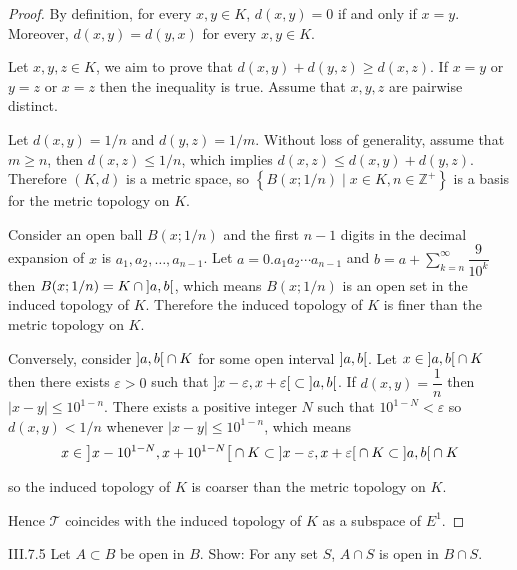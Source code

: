 \begin{proof}
	By definition, for every \( x, y \in K \), \( d(x, y) = 0 \) if and only if \( x = y \). Moreover, \( d(x, y) = d(y, x) \) for every \( x, y \in K \).

	Let \( x, y, z \in K \), we aim to prove that \( d(x, y) + d(y, z) \ge d(x, z) \). If \( x = y \) or \( y = z \) or \( x = z \) then the inequality is true. Assume that \( x, y, z \) are pairwise distinct.

	Let \( d(x, y) = 1/n \) and \( d(y, z) = 1/m \). Without loss of generality, assume that \( m \ge n \), then \( d(x, z) \le 1/n \), which implies \( d(x, z) \le d(x, y) + d(y, z) \). Therefore \( (K, d) \) is a metric space, so \( \left\{ B(x; 1/n) \mid x \in K, n \in \mathbb{Z}^{+} \right\} \) is a basis for the metric topology on \( K \).

	Consider an open ball \( B(x; 1/n) \) and the first \( n - 1 \) digits in the decimal expansion of \( x \) is \( a_{1}, a_{2}, \ldots, a_{n-1} \). Let \( a = 0.a_{1}a_{2}\cdots a_{n-1} \) and \( b = a + \sum^{\infty}_{k=n}\dfrac{9}{10^{k}} \) then \( B(x; 1/n) = K \cap \left\rbrack{a, b}\right\lbrack \), which means \( B(x; 1/n) \) is an open set in the induced topology of \( K \). Therefore the induced topology of \(K\) is finer than the metric topology on \( K \).

	Conversely, consider \( \left\rbrack{a, b}\right\lbrack \cap K \) for some open interval \( \left\rbrack{a, b}\right\lbrack \). Let \( x \in \left\rbrack{a, b}\right\lbrack \cap K \) then there exists \( \varepsilon > 0 \) such that \( \left\rbrack{x - \varepsilon, x + \varepsilon}\right\lbrack \subset \left\rbrack{a, b}\right\lbrack \). If \( d(x, y) = \dfrac{1}{n} \) then \( \left\vert{x - y}\right\vert \le 10^{1-n} \). There exists a positive integer \(N\) such that \( 10^{1-N} < \varepsilon \) so \( d(x, y) < 1/n \) whenever \( \left\vert{x - y}\right\vert \le 10^{1-n} \), which means
	\[
		x \in \left\rbrack{x - 10^{1-N}, x + 10^{1-N}}\right\lbrack \cap K \subset \left\rbrack{x - \varepsilon, x + \varepsilon}\right\lbrack \cap K \subset \left\rbrack{a, b}\right\lbrack \cap K
	\]

	so the induced topology of \( K \) is coarser than the metric topology on \( K \).

	Hence \( \mathscr{T} \) coincides with the induced topology of \(K\) as a subspace of \( E^{1} \).
\end{proof}

\begin{problem}{III.7.5}
Let \(A \subset B\) be open in \(B\). Show: For any set \( S \), \( A \cap S \) is open in \( B \cap S \).
\end{problem}


